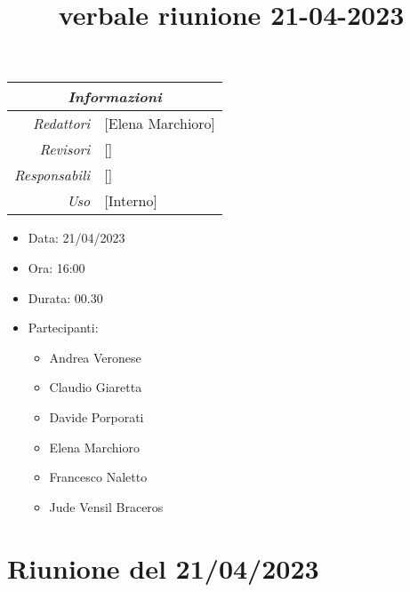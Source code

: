 \documentclass[12pt]{article}
\begin{document}
\graphicspath{ {../../templates/img} }

\title{verbale riunione 21-04-2023}

\firstPage
\maketitle

\begin{center}
\begin{tabular}{r | l}
    \multicolumn{2}{c}{\textit{Informazioni}}\\
    \hline
    
        \textit{Redattori} &
        [Elena Marchioro]\makecell{}\\
    
        \textit{Revisori} &
        []\makecell{}\\
        \textit{Responsabili} &
        []\makecell{}\\
            \textit{Uso} & 
            [Interno]\makecell{}\\
\end{tabular}
    \begin{itemize}
    \item[] Data: 21/04/2023
    \item[] Ora: 16:00
    \item[] Durata: 00.30
    \item[] Partecipanti:
    \begin{itemize}
    \item[] Andrea Veronese
    \item[] Claudio Giaretta
    \item[] Davide Porporati
    \item[] Elena Marchioro
    \item[] Francesco Naletto
    \item[] Jude Vensil Braceros
    \end{itemize}
    \end{itemize}
\end{center}


\tableofcontents
\printindex 
\section{Riunione del 21/04/2023}
\end{document}
